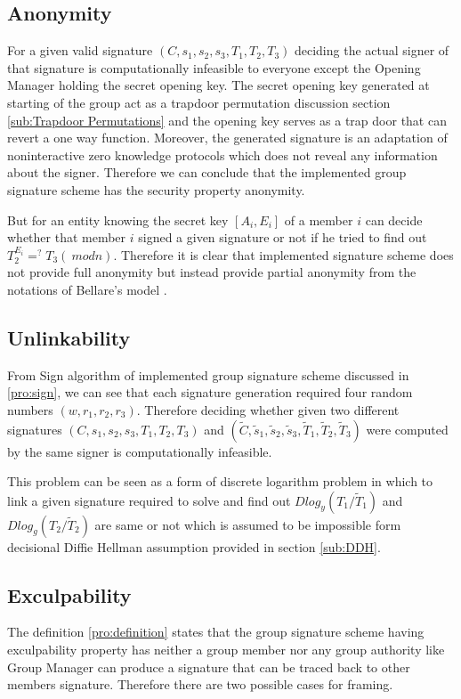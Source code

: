 \subsection{Anonymity}
For a given valid signature $(C, s_1, s_2, s_3, T_1, T_2, T_3)$ deciding the actual signer of that signature is computationally infeasible to everyone except the Opening Manager holding the secret opening key. The secret opening key generated at starting of the group act as a trapdoor permutation discussion section \ref{sub:Trapdoor Permutations} and the opening key serves as a trap door that can revert a one way function. Moreover, the generated signature is an adaptation of noninteractive zero knowledge protocols which does not reveal any information about the signer. Therefore we can conclude that the implemented group signature scheme has the security property anonymity. 

But for an entity knowing the secret key $[A_i, E_i]$ of a member $i$ can decide whether that member $i$ signed a given signature or not if he tried to find out $T_2^{E_i} =^? T_3 (~mod n)$. Therefore it is clear that implemented signature scheme does not provide full anonymity but instead provide partial anonymity from the notations of Bellare's model \cite{bellare2003foundations}.

\subsection{Unlinkability}
From Sign algorithm of implemented group signature scheme discussed in \ref{pro:sign}, we can see that each signature generation required four random numbers $(w, r_1, r_2, r_3)$. Therefore deciding whether given two different signatures $(C, s_1, s_2, s_3, T_1, T_2, T_3)$ and $(\tilde{C}, \tilde{s}_1, \tilde{s}_2, \tilde{s}_3, \tilde{T}_1, \tilde{T}_2, \tilde{T}_3)$ were computed by the same signer is computationally infeasible. 

This problem can be seen as a form of discrete logarithm problem in which to link a given signature required to solve and find out $Dlog_y(T_1/\tilde{T}_1)$ and $Dlog_g(T_2/\tilde{T}_2)$ are same or not which is assumed to be impossible form decisional Diffie Hellman assumption provided in section \ref{sub:DDH}.

\subsection{Exculpability}
The definition \ref{pro:definition} states that the group signature scheme having exculpability property has neither a group member nor any group authority like Group Manager can produce a signature that can be traced back to other members signature. Therefore there are two possible cases for framing.

